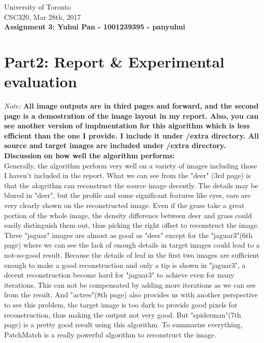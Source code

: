 \documentclass{article}
\begin{document}
\noindent
University of Toronto\\
{\sc CSC}320, Mar 28th, 2017\\[10pt]
{\LARGE\bf Assignment 3: Yuhui Pan - 1001239395 - panyuhui} \\[10pt]

\section*{Part2: Report \& Experimental evaluation }
\noindent
\textit{Note:}
\textbf{All image outputs are in third pages and forward, and the second page is a demostration of the image layout in my report. Also, you can see another version of implmentation for this algorithm which is less efficient than the one I provide. I include it under /extra directory. All source and target images are included under /extra directory.}\\[8pt]

\noindent
\textbf{Discussion on how well the algorithm performs:}\\[8pt]
Generally, the algorithm perform very well on a variety of images including those I haven't included in the report. What we can see from the "deer" (3rd page) is that the alogrithm can reconstruct the source image decently. The details may be blured in "deer", but the profile and some significant features like eyes, ears are very clearly shown on the reconstructed image. Even if the grass take a great portion of the whole image, the density difference between deer and grass could easily distinguish them out, thus picking the right offset to reconstruct the image. Three "jaguar" images are almost as good as "deer" except for the "jaguar3"(6th page) where we can see the lack of enough details in target images could lead to a not-so-good result. Because the details of leaf in the first two images are sufficient enough to make a good reconstruction and only a tip is shown in "jaguar3", a decent reconstruction become hard for "jaguar3" to achieve even for many iterations. This can not be compensated by adding more iterations as we can see from the result. And "actree"(8th page) also provides us with another perspective to see this problem, the target image is too dark to provide good pixels for reconstruction, thus making the output not very good. But "spiderman"(7th page) is a pretty good result using this algorithm. To summarize everything, PatchMatch is a really powerful algorithm to reconstruct the image.\\
\end{document}

